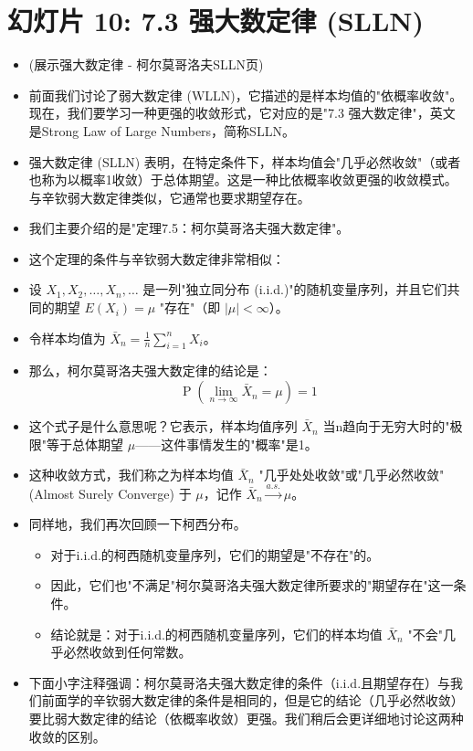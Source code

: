 \documentclass[UTF8]{article} %
\DeclareMathOperator{\Prob}{\operatorname{P}}
\begin{document}
\section*{幻灯片 10: 7.3 强大数定律 (SLLN)}
\begin{itemize}
    \itemsep1em
    \item (展示强大数定律 - 柯尔莫哥洛夫SLLN页)
    \item 前面我们讨论了弱大数定律 (WLLN)，它描述的是样本均值的"依概率收敛"。现在，我们要学习一种更强的收敛形式，它对应的是"7.3 强大数定律"，英文是Strong Law of Large Numbers，简称SLLN。
    \item 强大数定律 (SLLN) 表明，在特定条件下，样本均值会"几乎必然收敛"（或者也称为以概率1收敛）于总体期望。这是一种比依概率收敛更强的收敛模式。与辛钦弱大数定律类似，它通常也要求期望存在。
    \item 我们主要介绍的是"定理7.5：柯尔莫哥洛夫强大数定律"。
    \item 这个定理的条件与辛钦弱大数定律非常相似：
    \item 设 $X_1, X_2, \dots, X_n, \dots$ 是一列"独立同分布 (i.i.d.)"的随机变量序列，并且它们共同的期望 $E(X_i) = \mu$ "存在"（即 $|\mu| < \infty$）。
    \item 令样本均值为 $\bar{X}_n = \frac{1}{n} \sum_{i=1}^{n} X_i$。
    \item 那么，柯尔莫哥洛夫强大数定律的结论是：
    \[ \Prob\left( \lim_{n \to \infty} \bar{X}_n = \mu \right) = 1 \]
    \item 这个式子是什么意思呢？它表示，样本均值序列 $\bar{X}_n$ 当n趋向于无穷大时的"极限"等于总体期望 $\mu$——这件事情发生的"概率"是1。
    \item 这种收敛方式，我们称之为样本均值 $\bar{X}_n$ "几乎处处收敛"或"几乎必然收敛"(Almost Surely Converge) 于 $\mu$，记作 $\bar{X}_n \xrightarrow{a.s.} \mu$。
    \item 同样地，我们再次回顾一下柯西分布。
    \begin{itemize}[label=\textbullet, itemsep=0.3em]
        \item 对于i.i.d.的柯西随机变量序列，它们的期望是"不存在"的。
        \item 因此，它们也"不满足"柯尔莫哥洛夫强大数定律所要求的"期望存在"这一条件。
        \item 结论就是：对于i.i.d.的柯西随机变量序列，它们的样本均值 $\bar{X}_n$ "不会"几乎必然收敛到任何常数。
    \end{itemize}
    \item 下面小字注释强调：柯尔莫哥洛夫强大数定律的条件（i.i.d.且期望存在）与我们前面学的辛钦弱大数定律的条件是相同的，但是它的结论（几乎必然收敛）要比弱大数定律的结论（依概率收敛）更强。我们稍后会更详细地讨论这两种收敛的区别。
\end{itemize}
\end{document}
